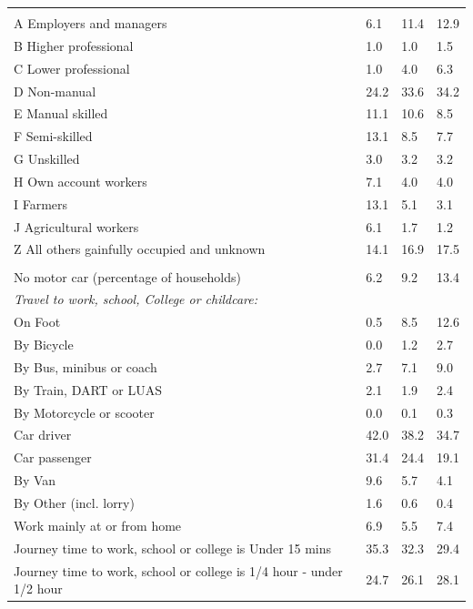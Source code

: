 \documentclass{article}
\begin{document}
\begin{table}[h]
\begin{tabular}{KTTT}
\hline
    \\ 
    \hline
A Employers and managers &  6.1& 11.4& 12.9\\
B Higher professional & 1.0& 1.0& 1.5\\
C Lower professional & 1.0& 4.0& 6.3\\
D Non-manual & 24.2& 33.6& 34.2\\
E Manual skilled & 11.1& 10.6&  8.5\\
F Semi-skilled & 13.1&  8.5&  7.7\\
G Unskilled & 3.0& 3.2& 3.2\\
H Own account workers & 7.1& 4.0& 4.0\\
I Farmers & 13.1&  5.1&  3.1\\
J Agricultural workers & 6.1& 1.7& 1.2\\
Z All others gainfully occupied and unknown & 14.1& 16.9& 17.5\\
\hline
{}\hline
    \\ 
    \hline
No motor car (percentage of households) &  6.2&  9.2& 
13.4\\
    \hline
\emph{Travel to work, school, College or childcare:} & & & \\
\quad On Foot &  0.5&  8.5& 12.6\\
\quad By Bicycle & 0.0& 1.2& 2.7\\
\quad By Bus, minibus or coach & 2.7& 7.1& 9.0\\
\quad By Train, DART or LUAS & 2.1& 1.9& 2.4\\
\quad By Motorcycle or scooter & 0.0& 0.1& 0.3\\
\quad Car driver & 42.0& 38.2& 34.7\\
\quad Car passenger & 31.4& 24.4& 19.1\\
\quad By Van & 9.6& 5.7& 4.1\\
\quad By Other (incl. lorry) & 1.6& 0.6& 0.4\\
    \hline
Work mainly at or from home & 6.9& 5.5& 7.4\\
Journey time to work, school or college is Under 15 mins & 35.3& 32.3& 29.4\\
Journey time to work, school or college is 1/4 hour - under 1/2 hour & 24.7& 26.1& 28.1\\

\end{tabular}
\end{table}
\end{document}
